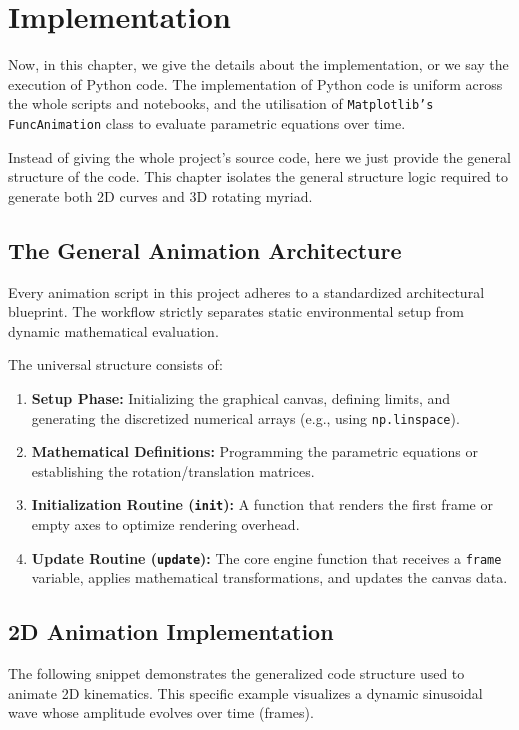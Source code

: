 \documentclass[12pt, a4paper]{report}
\begin{document}
\chapter{Implementation}

Now, in this chapter, we give the details about the implementation, or we say the execution of Python code. The implementation of Python code is uniform across the whole scripts and notebooks, and the utilisation of \texttt{Matplotlib's FuncAnimation} class to evaluate parametric equations over time.

Instead of giving the whole project's source code, here we just provide the general structure of the code. This chapter isolates the general structure logic required to generate both 2D curves and 3D rotating myriad.

\section{The General Animation Architecture}
Every animation script in this project adheres to a standardized architectural blueprint. The workflow strictly separates static environmental setup from dynamic mathematical evaluation. 

The universal structure consists of:
\begin{enumerate}
    \item \textbf{Setup Phase:} Initializing the graphical canvas, defining limits, and generating the discretized numerical arrays (e.g., using \texttt{np.linspace}).
    \item \textbf{Mathematical Definitions:} Programming the parametric equations or establishing the rotation/translation matrices.
    \item \textbf{Initialization Routine (\texttt{init}):} A function that renders the first frame or empty axes to optimize rendering overhead.
    \item \textbf{Update Routine (\texttt{update}):} The core engine function that receives a \texttt{frame} variable, applies mathematical transformations, and updates the canvas data.
\end{enumerate}

\section{2D Animation Implementation}
The following snippet demonstrates the generalized code structure used to animate 2D kinematics. This specific example visualizes a dynamic sinusoidal wave whose amplitude evolves over time (frames).
\end{document}
